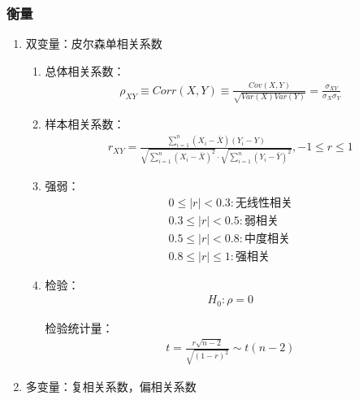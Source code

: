 \documentclass[12pt]{book}
\begin{document}
\subsubsection{衡量}


\begin{enumerate}[1.]
    \item 双变量：皮尔森单相关系数
          \begin{enumerate}[(1)]
              \item 总体相关系数：
                    \begin{gather*}
                        \rho_{XY}\equiv Corr\left(X,Y\right)\equiv\frac{Cov\left(X,Y\right)}{\sqrt{Var\left(X\right)Var\left(Y\right)}}
                        =\frac{\sigma_{XY}}{\sigma_X\sigma_Y}
                    \end{gather*}
              \item 样本相关系数：
                    \begin{gather*}
                        r_{XY} = \frac{\sum_{i=1}^{n}{ (X_i-\bar{X})(Y_i-Y)}}{\sqrt{\sum_{i=1}^{n}{(X_i-\bar{X})^2}}\cdot \sqrt{\sum_{i=1}^{n}{(Y_i-\bar{Y})^2}}  }, -1\leq r \leq 1
                    \end{gather*}
              \item 强弱：
                    \begin{align*}
                        0\le\left|r\right|<0.3:\text{无线性相关} \\
                        0.3\le\left|r\right|<0.5:\text{弱相关}   \\
                        0.5\le\left|r\right|<0.8:\text{中度相关} \\
                        0.8\le\left|r\right|\le1:\text{强相关}
                    \end{align*}
              \item 检验：
                    \begin{gather*}
                        H_0: \rho =0
                    \end{gather*}
                    \par 检验统计量：
                    \begin{gather*}
                        t = \frac{r\sqrt{n-2}}{\sqrt{(1-r)^2}} \sim t(n-2)
                    \end{gather*}
          \end{enumerate}
    \item 多变量：复相关系数，偏相关系数
\end{enumerate}
\end{document}
